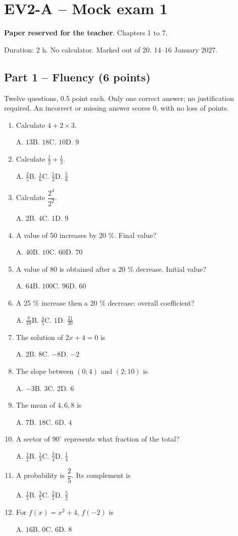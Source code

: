 \clearpage\section*{EV2-A -- Mock exam 1}\label{EV2-A}
\textbf{Paper reserved for the teacher}. Chapters 1 to 7.\par Duration: 2 h. No calculator. Marked out of 20. 14--16 January 2027.
\subsection*{Part 1 -- Fluency (6 points)}
Twelve questions, 0.5 point each. Only one correct answer; no justification required. An incorrect or missing answer scores 0, with no loss of points.
\begin{enumerate}
\item Calculate $4+2\times3$.\par A. $13$\quad B. $18$\quad C. $10$\quad D. $9$
\item Calculate $\frac12+\frac13$.\par A. $\frac{2}{5}$\quad B. $\frac{1}{6}$\quad C. $\frac{5}{3}$\quad D. $\frac{5}{6}$
\item Calculate $\dfrac{2^4}{2^{2}}$.\par A. $2$\quad B. $4$\quad C. $1$\quad D. $9$
\item A value of 50 increases by 20 \%. Final value?\par A. $40$\quad B. $10$\quad C. $60$\quad D. $70$
\item A value of 80 is obtained after a 20 \% decrease. Initial value?\par A. $64$\quad B. $100$\quad C. $96$\quad D. $60$
\item A 25 \% increase then a 20 \% decrease: overall coefficient?\par A. $\frac{9}{10}$\quad B. $\frac{4}{5}$\quad C. $1$\quad D. $\frac{21}{20}$
\item The solution of $2x+4=0$ is\par A. $2$\quad B. $8$\quad C. $-8$\quad D. $-2$
\item The slope between $(0;4)$ and $(2;10)$ is\par A. $-3$\quad B. $3$\quad C. $2$\quad D. $6$
\item The mean of $4, 6, 8$ is\par A. $7$\quad B. $18$\quad C. $6$\quad D. $4$
\item A sector of $90^\circ$ represents what fraction of the total?\par A. $\frac{1}{2}$\quad B. $\frac{1}{3}$\quad C. $\frac{3}{4}$\quad D. $\frac{1}{4}$
\item A probability is $\dfrac{2}{5}$. Its complement is\par A. $\frac{1}{5}$\quad B. $\frac{3}{5}$\quad C. $\frac{2}{5}$\quad D. $\frac{5}{2}$
\item For $f(x)=x^2+4$, $f(-2)$ is\par A. $16$\quad B. $0$\quad C. $6$\quad D. $8$
\end{enumerate}
